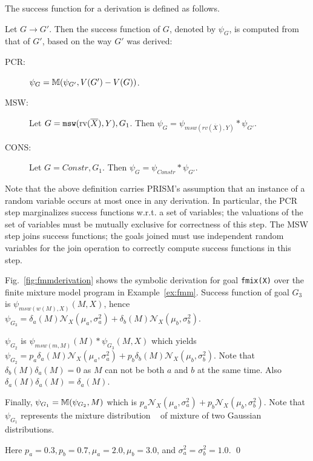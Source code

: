 The success function for a derivation is defined as
follows.
\begin{Def}
 Let $G \rightarrow G'$.  Then the success function of $G$, denoted by
 $\psi_G$, is computed from that of $G'$, based on the way $G'$ was derived:
\begin{description}
\item[PCR:] $\psi_G = \mathbb{M}(\psi_{G'}, V(G') - V(G))$.
\item[MSW:] Let $G= \mbox{\tt msw}(\mbox{\rm rv}(\overline{X}), Y), G_1$.
  Then $\psi_G = \psi_{msw(rv(\overline{X}),Y)} * \psi_{G'}$.
\item[CONS:] Let $G= Constr, G_1$.  Then
  $\psi_G = \psi_{Constr} * \psi_{G'}.$
\end{description}
\end{Def}
Note that the above definition carries PRISM's assumption that an
instance of a random variable occurs at most once in any derivation.
In particular, the PCR step marginalizes success functions w.r.t. a
set of variables; the valuations of the set of variables must be 
mutually exclusive for correctness of this step.  The MSW step joins
success functions; the goals joined must use independent random
variables for the join operation to correctly compute success
functions in this step. 


\begin{Ex}
  Fig.~\ref{fig:fmmderivation} shows the symbolic derivation
  for goal \texttt{fmix(X)} over the finite mixture model program in
  Example~\ref{ex:fmm}.  Success function of goal $G_{3}$ is
  $\psi_{msw(w(M),X)}(M,X)$, hence $\psi_{G_3} = \delta_{a}(M)
  \mathcal{N}_{X}(\mu_{a}, \sigma^{2}_{a}) + \delta_{b}(M) \mathcal{N}_{X}(\mu_{b}, \sigma^{2}_{b})$.

  $\psi_{G_{2}}$ is $\psi_{msw(m, M)}(M) * \psi_{G_{3}}(M,X)$ which yields $\psi_{G_2} = p_{a} \delta_{a}(M)
   \mathcal{N}_{X}(\mu_{a}, \sigma^{2}_{a}) +  p_{b} \delta_{b}(M) \mathcal{N}_{X}(\mu_{b}, \sigma^{2}_{b})$.
Note that  $\delta_{b}(M)\delta_{a}(M)=0$ as $M$ can not be both $a$ and $b$ at the same time.
Also $\delta_{a}(M)\delta_{a}(M) = \delta_{a}(M)$.

  Finally, $\psi_{G_1} = \mathbb{M}(\psi_{G_2}, M)$ which is $p_{a} 
  \mathcal{N}_{X}(\mu_{a}, \sigma^{2}_{a}) + p_{b}  \mathcal{N}_{X}(\mu_{b}, \sigma^{2}_{b})$.  Note
  that $\psi_{G_1}$ represents the mixture distribution ~\cite{fmm} of
  mixture of two Gaussian distributions.  
  
  Here $p_{a} = 0.3, p_{b} = 0.7, \mu_{a} = 2.0, \mu_{b} = 3.0$, and $\sigma^{2}_{a} = \sigma^{2}_{b} = 1.0$.
  \qed
\end{Ex}



